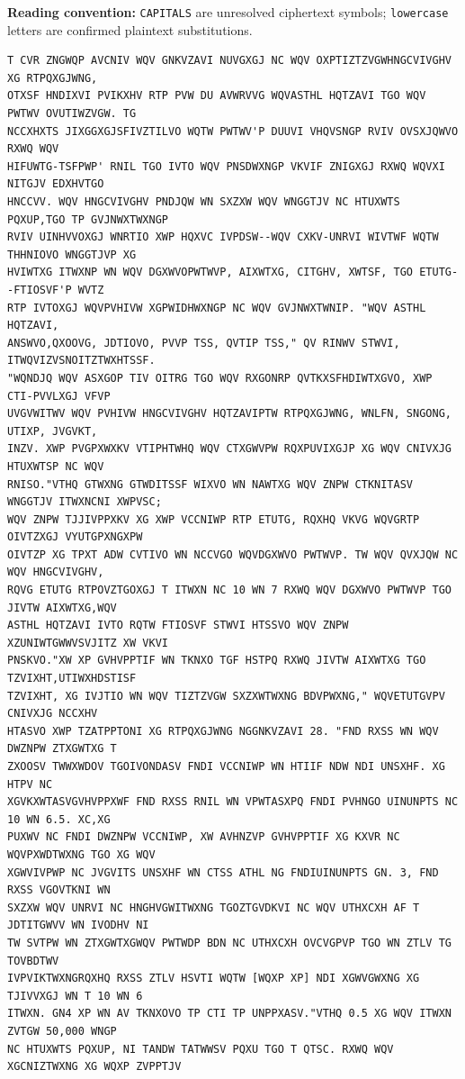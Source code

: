 \documentclass[11pt,a4paper]{article}
\newcommand{\caselegend}{%
  \noindent\textbf{Reading convention: }
  \texttt{CAPITALS} are unresolved ciphertext symbols; 
  \texttt{lowercase} letters are confirmed plaintext substitutions.\par
}
\begin{document}
\caselegend
\begin{lstlisting}[style=ciphertext,caption={Variant 20 intercepted ciphertext}]
T CVR ZNGWQP AVCNIV WQV GNKVZAVI NUVGXGJ NC WQV OXPTIZTZVGWHNGCVIVGHV XG RTPQXGJWNG,
OTXSF HNDIXVI PVIKXHV RTP PVW DU AVWRVVG WQVASTHL HQTZAVI TGO WQV PWTWV OVUTIWZVGW. TG
NCCXHXTS JIXGGXGJSFIVZTILVO WQTW PWTWV'P DUUVI VHQVSNGP RVIV OVSXJQWVO RXWQ WQV
HIFUWTG-TSFPWP' RNIL TGO IVTO WQV PNSDWXNGP VKVIF ZNIGXGJ RXWQ WQVXI NITGJV EDXHVTGO
HNCCVV. WQV HNGCVIVGHV PNDJQW WN SXZXW WQV WNGGTJV NC HTUXWTS PQXUP,TGO TP GVJNWXTWXNGP
RVIV UINHVVOXGJ WNRTIO XWP HQXVC IVPDSW--WQV CXKV-UNRVI WIVTWF WQTW THHNIOVO WNGGTJVP XG
HVIWTXG ITWXNP WN WQV DGXWVOPWTWVP, AIXWTXG, CITGHV, XWTSF, TGO ETUTG--FTIOSVF'P WVTZ
RTP IVTOXGJ WQVPVHIVW XGPWIDHWXNGP NC WQV GVJNWXTWNIP. "WQV ASTHL HQTZAVI,
ANSWVO,QXOOVG, JDTIOVO, PVVP TSS, QVTIP TSS," QV RINWV STWVI, ITWQVIZVSNOITZTWXHTSSF.
"WQNDJQ WQV ASXGOP TIV OITRG TGO WQV RXGONRP QVTKXSFHDIWTXGVO, XWP CTI-PVVLXGJ VFVP
UVGVWITWV WQV PVHIVW HNGCVIVGHV HQTZAVIPTW RTPQXGJWNG, WNLFN, SNGONG, UTIXP, JVGVKT,
INZV. XWP PVGPXWXKV VTIPHTWHQ WQV CTXGWVPW RQXPUVIXGJP XG WQV CNIVXJG HTUXWTSP NC WQV
RNISO."VTHQ GTWXNG GTWDITSSF WIXVO WN NAWTXG WQV ZNPW CTKNITASV WNGGTJV ITWXNCNI XWPVSC;
WQV ZNPW TJJIVPPXKV XG XWP VCCNIWP RTP ETUTG, RQXHQ VKVG WQVGRTP OIVTZXGJ VYUTGPXNGXPW
OIVTZP XG TPXT ADW CVTIVO WN NCCVGO WQVDGXWVO PWTWVP. TW WQV QVXJQW NC WQV HNGCVIVGHV,
RQVG ETUTG RTPOVZTGOXGJ T ITWXN NC 10 WN 7 RXWQ WQV DGXWVO PWTWVP TGO JIVTW AIXWTXG,WQV
ASTHL HQTZAVI IVTO RQTW FTIOSVF STWVI HTSSVO WQV ZNPW XZUNIWTGWWVSVJITZ XW VKVI
PNSKVO."XW XP GVHVPPTIF WN TKNXO TGF HSTPQ RXWQ JIVTW AIXWTXG TGO TZVIXHT,UTIWXHDSTISF
TZVIXHT, XG IVJTIO WN WQV TIZTZVGW SXZXWTWXNG BDVPWXNG," WQVETUTGVPV CNIVXJG NCCXHV
HTASVO XWP TZATPPTONI XG RTPQXGJWNG NGGNKVZAVI 28. "FND RXSS WN WQV DWZNPW ZTXGWTXG T
ZXOOSV TWWXWDOV TGOIVONDASV FNDI VCCNIWP WN HTIIF NDW NDI UNSXHF. XG HTPV NC
XGVKXWTASVGVHVPPXWF FND RXSS RNIL WN VPWTASXPQ FNDI PVHNGO UINUNPTS NC 10 WN 6.5. XC,XG
PUXWV NC FNDI DWZNPW VCCNIWP, XW AVHNZVP GVHVPPTIF XG KXVR NC WQVPXWDTWXNG TGO XG WQV
XGWVIVPWP NC JVGVITS UNSXHF WN CTSS ATHL NG FNDIUINUNPTS GN. 3, FND RXSS VGOVTKNI WN
SXZXW WQV UNRVI NC HNGHVGWITWXNG TGOZTGVDKVI NC WQV UTHXCXH AF T JDTITGWVV WN IVODHV NI
TW SVTPW WN ZTXGWTXGWQV PWTWDP BDN NC UTHXCXH OVCVGPVP TGO WN ZTLV TG TOVBDTWV
IVPVIKTWXNGRQXHQ RXSS ZTLV HSVTI WQTW [WQXP XP] NDI XGWVGWXNG XG TJIVVXGJ WN T 10 WN 6
ITWXN. GN4 XP WN AV TKNXOVO TP CTI TP UNPPXASV."VTHQ 0.5 XG WQV ITWXN ZVTGW 50,000 WNGP
NC HTUXWTS PQXUP, NI TANDW TATWWSV PQXU TGO T QTSC. RXWQ WQV XGCNIZTWXNG XG WQXP ZVPPTJV

\end{lstlisting}
\end{document}
